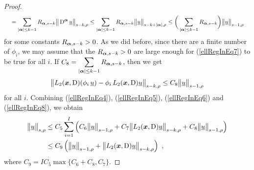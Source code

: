 \begin{proof}
\begin{align}
&\quad = \sum_{|{\bm{\alpha}}|\leq k-1} R_{{\bm{\alpha}},s-k}
\big\|\operatorname{D}^{{\bm{\alpha}}} \underline{u} \big\|_{s-k,\rho}
\leq \sum_{|{\bm{\alpha}}|\leq k-1} R_{{\bm{\alpha}},s-k}
\big\| \underline{u} \big\|_{s-k+|{\bm{\alpha}}|,\rho}
\leq \bigg( \sum_{|{\bm{\alpha}}|\leq k-1} R_{{\bm{\alpha}},s-k} \bigg)
\big\| \underline{u} \big\|_{s-1,\rho} \label{ellRegInEq7}
\end{align}
for some constants $R_{{\bm{\alpha}},s-k}>0$.
As we did before, since there are a finite number of $\phi_i$, we may
assume that the $R_{{\bm{\alpha}},s-k}>0$ are large
enough for (\ref{ellRegInEq7}) to be true for all $i$.
If $\displaystyle C_8 = \sum_{|{\bm{\alpha}}|\leq k-1} R_{{\bm{\alpha}},s-k}$,
then we get
\begin{equation} \label{ellRegInEq8}
\big\|L_2({\bm{x}},\operatorname{D})(\phi_i\,\underline{u})
- \phi_i\, L_2({\bm{x}},\operatorname{D})\underline{u} \big\|_{s-k,\rho}
\leq C_8 \big\| \underline{u} \big\|_{s-1,\rho}
\end{equation}
for all $i$.  Combining (\ref{ellRegInEq4}), (\ref{ellRegInEq5}),
(\ref{ellRegInEq6}) and (\ref{ellRegInEq8}), we obtain
\begin{align}
\big\|\underline{u}\big\|_{s,\rho}
&\leq C_5 \sum_{i=1}^I  
\left( C_6 \big\|\underline{u}\big\|_{s-1,\rho} 
+ C_7 \big\|L_2({\bm{x}},\operatorname{D})\underline{u}\big\|_{s-k,\rho}
+ C_8 \big\| \underline{u} \big\|_{s-1,\rho} \right) \nonumber \\
&\leq C_9 \left( \big\|\underline{u}\big\|_{s-1,\rho}
+ \big\|L_2({\bm{x}},\operatorname{D})\underline{u}\big\|_{s-k,\rho} \right) \ ,
\label{ellRegInEq9}
\end{align}
where $C_9 = I C_5 \max\{ C_6 + C_8, C_7\}$.


\end{proof}
